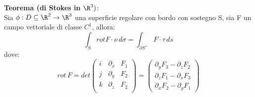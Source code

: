 \documentclass{article}
\begin{document}
\textbf{Teorema (di Stokes in $\R^3)$}:\\
Sia $\phi:D\subseteq\R^2\rightarrow\R^3$ una superficie regolare con bordo con sostegno S, sia F un campo vettoriale di classe $C^1$, allora:
$$ \int_SrotF\cdot\nu\,d\sigma=\int_{\partial S^+}F\cdot\tau\,ds $$
dove:
$$ rot\,F=det\begin{pmatrix} i & \partial_x & F_1\\j & \partial_y & F_2\\k & \partial_z & F_2\\ \end{pmatrix} = \begin{pmatrix} \partial_yF_3-\partial_zF_2\\\partial_zF_1-\partial_xF_3\\\partial_xF_2-\partial_yF_1\end{pmatrix} $$




\newpage
\Index
\end{document}

